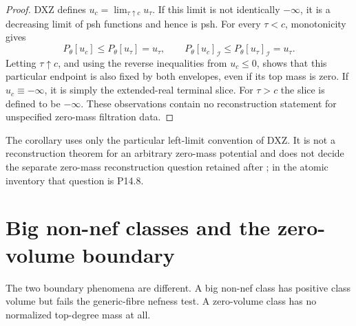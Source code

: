 \begin{proof}
DXZ defines \(u_c=\lim_{\tau\uparrow c}u_\tau\).
If this limit is not identically \(-\infty\), it is a decreasing limit of
psh functions and hence is psh.
For every \(\tau<c\), monotonicity gives
\[
 P_\theta[u_c]\leq P_\theta[u_\tau]=u_\tau,\qquad
 P_\theta[u_c]_{\mathcal I}\leq
                          P_\theta[u_\tau]_{\mathcal I}=u_\tau.
\]
Letting \(\tau\uparrow c\), and using the reverse inequalities from
\(u_c\leq0\), shows that this particular endpoint is also fixed by both
envelopes, even if its top mass is zero.
If \(u_c\equiv-\infty\), it is simply the extended-real terminal slice.
For \(\tau>c\) the slice is defined to be \(-\infty\).
These observations contain no reconstruction statement for unspecified
zero-mass filtration data.
\end{proof}

The corollary uses only the particular left-limit convention of DXZ.  It is
not a reconstruction theorem for an arbitrary zero-mass potential and does
not decide the separate zero-mass reconstruction question retained after
; in the atomic inventory that question is
P14.8.

\section{Big non-nef classes and the zero-volume boundary}

The two boundary phenomena are different.  A big non-nef class has
positive class volume but fails the generic-fibre nefness test.  A
zero-volume class has no normalized top-degree mass at all.

